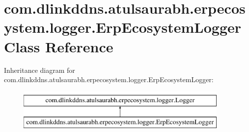 \hypertarget{classcom_1_1dlinkddns_1_1atulsaurabh_1_1erpecosystem_1_1logger_1_1_erp_ecosystem_logger}{}\section{com.\+dlinkddns.\+atulsaurabh.\+erpecosystem.\+logger.\+Erp\+Ecosystem\+Logger Class Reference}
\label{classcom_1_1dlinkddns_1_1atulsaurabh_1_1erpecosystem_1_1logger_1_1_erp_ecosystem_logger}
Inheritance diagram for com.\+dlinkddns.\+atulsaurabh.\+erpecosystem.\+logger.\+Erp\+Ecosystem\+Logger\+:\begin{figure}[H]
\begin{center}
\leavevmode
\includegraphics[height=2.000000cm]{classcom_1_1dlinkddns_1_1atulsaurabh_1_1erpecosystem_1_1logger_1_1_erp_ecosystem_logger}
\end{center}
\end{figure}
